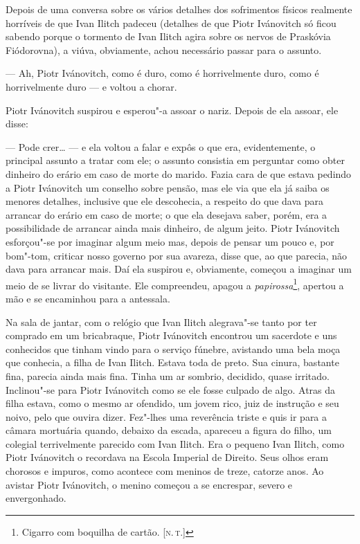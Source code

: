 Depois de uma conversa sobre os vários detalhes dos sofrimentos físicos
realmente horríveis de que Ivan Ilitch padeceu (detalhes de que Piotr
Ivánovitch só ficou sabendo porque o tormento de Ivan Ilitch agira sobre
os nervos de Praskóvia Fiódorovna), a viúva, obviamente, achou
necessário passar para o assunto.

--- Ah, Piotr Ivánovitch, como é duro, como é horrivelmente duro, como é
horrivelmente duro --- e voltou a chorar.

Piotr Ivánovitch suspirou e esperou"-a assoar o nariz. Depois de ela
assoar, ele disse:

--- Pode crer\ldots{} --- e ela voltou a falar e expôs o que era, evidentemente,
o principal assunto a tratar com ele; o assunto consistia em perguntar
como obter dinheiro do erário em caso de morte do marido. Fazia cara de
que estava pedindo a Piotr Ivánovitch um conselho sobre pensão, mas ele
via que ela já saiba os menores detalhes, inclusive que ele descohecia,
a respeito do que dava para arrancar do erário em caso de morte; o que
ela desejava saber, porém, era a possibilidade de arrancar ainda mais
dinheiro, de algum jeito. Piotr Ivánovitch esforçou"-se por imaginar
algum meio mas, depois de pensar um pouco e, por bom"-tom, criticar nosso
governo por sua avareza, disse que, ao que parecia, não dava para
arrancar mais. Daí ela suspirou e, obviamente, começou a imaginar um
meio de se livrar do visitante. Ele compreendeu, apagou a
\emph{papirossa}\footnote{Cigarro com boquilha de cartão. {[}\textsc{n.\,t.}{]}},
apertou a mão e se encaminhou para a antessala.

Na sala de jantar, com o relógio que Ivan Ilitch alegrava"-se tanto por
ter comprado em um bricabraque, Piotr Ivánovitch encontrou um sacerdote
e uns conhecidos que tinham vindo para o serviço fúnebre, avistando uma
bela moça que conhecia, a filha de Ivan Ilitch. Estava toda de preto.
Sua cinura, bastante fina, parecia ainda mais fina. Tinha um ar sombrio,
decidido, quase irritado. Inclinou"-se para Piotr Ivánovitch como se ele
fosse culpado de algo. Atras da filha estava, como o mesmo ar ofendido,
um jovem rico, juiz de instrução e seu noivo, pelo que ouvira dizer.
Fez"-lhes uma reverência triste e quis ir para a câmara mortuária quando,
debaixo da escada, apareceu a figura do filho, um colegial terrivelmente
parecido com Ivan Ilitch. Era o pequeno Ivan Ilitch, como Piotr
Ivánovitch o recordava na Escola Imperial de Direito. Seus olhos eram
chorosos e impuros, como acontece com meninos de treze, catorze anos. Ao
avistar Piotr Ivánovitch, o menino começou a se encrespar, severo e
envergonhado.

